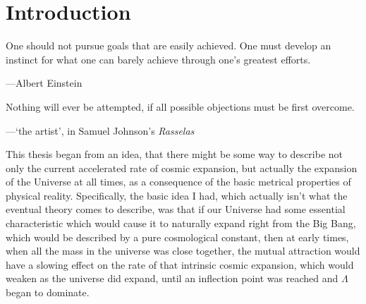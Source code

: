 \chapter*{Introduction\label{chap_I}}
\epigraph{One should not pursue goals that are easily achieved. One must develop an instinct for what one can barely achieve through one's greatest efforts.}{---Albert Einstein}
\epigraph{Nothing will ever be attempted, if all possible objections must be first overcome.}{---`the artist', in Samuel Johnson's \textit{Rasselas}}

This thesis began from an idea, that there might be some way to describe not only the current accelerated rate of cosmic expansion, but actually the expansion of the Universe at all times, as a consequence of the basic metrical properties of physical reality. Specifically, the basic idea I had, which actually isn't what the eventual theory comes to describe, was that if our Universe had some essential characteristic which would cause it to naturally expand right from the Big Bang, which would be described by a pure cosmological constant, then at early times, when all the mass in the universe was close together, the mutual attraction would have a slowing effect on the rate of that intrinsic cosmic expansion, which would weaken as the universe did expand, until an inflection point was reached and $\Lambda$ began to dominate.

